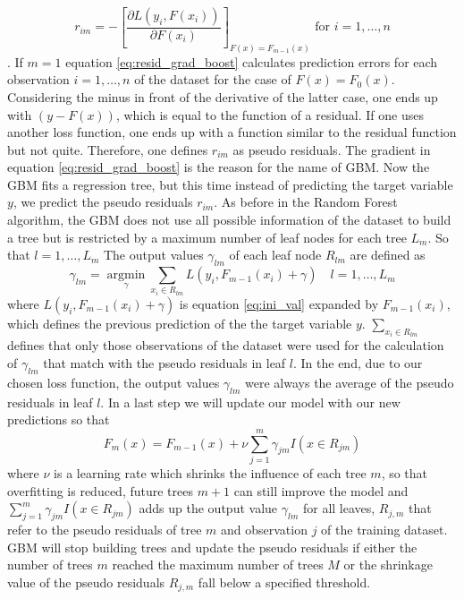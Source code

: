 \documentclass[12pt,a4paper]{article}
\begin{document}
\begin{equation}
 r_{i m}=-\left[\frac{\partial L\left(y_{i}, F\left(x_{i}\right)\right)}{\partial F\left(x_{i}\right)}\right]_{F(x)=F_{m-1}(x)} \text { for } i=1, \ldots, n
 \label{eq:resid_grad_boost}
 \end{equation}. If \(m = 1\) equation \ref{eq:resid_grad_boost} calculates prediction errors for each observation \(i = 1, \ldots,n\) of the dataset for the case of \(F(x) = F_{0}(x)\). Considering the minus in front of the derivative of the latter case, one ends up with \((y -F(x))\), which is equal to the function of a residual. If one uses another loss function, one ends up with a function similar to the residual function but not quite. Therefore, one defines \(r_{i m}\) as pseudo residuals. The gradient in equation \ref{eq:resid_grad_boost} is the reason for the name of GBM. Now the GBM fits a regression tree, but this time instead of predicting the target variable \(y\), we predict the pseudo residuals \(r_{im}\). As before in the Random Forest algorithm, the GBM does not use all possible information of the dataset to build a tree but is restricted by a maximum number of leaf nodes for each tree \(L_m\). So that \(l = 1,\ldots,L_m\) The output values \(\gamma_{l m}\) of each leaf node \(R_{lm}\) are defined as
\begin{equation}
\gamma_{l m}=\underset{\gamma}{\operatorname{argmin}} \sum_{x_{i} \in R_{lm}} L\left(y_{i}, F_{m-1}\left(x_{i}\right)+\gamma\right) \quad l = 1,\ldots,L_m
\label{eq:output_val}
\end{equation} where \(L\left(y_{i}, F_{m-1}\left(x_{i}\right)+\gamma\right)\) is equation \ref{eq:ini_val} expanded by \(F_{m-1}\left(x_{i}\right)\), which defines the previous prediction of the the target variable \(y\). \(\sum_{x_{i} \in R_{lm}}\) defines that only those observations of the dataset were used for the calculation of \(\gamma_{lm}\) that match with the pseudo residuals in leaf \(l\). In the end, due to our chosen loss function, the output values \(\gamma_{lm}\) were always the average of the pseudo residuals in leaf \(l\). In a last step we will update our model with our new predictions so that
\begin{equation}
F_{m}(x)=F_{m-1}(x)+\nu \sum_{j=1}^{m} \gamma_{j m} I\left(x \in R_{j m}\right)
\label{eq:mod_sum}
\end{equation} where \(\nu\) is a learning rate which shrinks the influence of each tree \(m\), so that overfitting is reduced, future trees \(m+1\) can still improve the model and \(\sum_{j=1}^{m} \gamma_{j m} I\left(x \in R_{j m}\right)\) adds up the output value \(\gamma_{lm}\) for all leaves, \(R_{j,m}\) that refer to the pseudo residuals of tree \(m\) and observation \(j\) of the training dataset. GBM will stop building trees and update the pseudo residuals if either the number of trees \(m\) reached the maximum number of trees \(M\) or the shrinkage value of the pseudo residuals \(R_{j,m}\) fall below a specified threshold.
\end{document}
